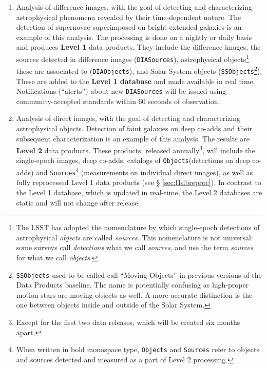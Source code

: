 \documentclass[12pt]{article}
\newcommand{\code}[1]{\texttt{#1}}
\newcommand{\DIASources}{\code{DIASources}\xspace}
\newcommand{\DIAObjects}{\code{DIAObjects}\xspace}
\newcommand{\DB}{{Level 1 database}\xspace}
\newcommand{\DR}{{Level 2 database}\xspace}
\newcommand{\Objects}{\code{Objects}\xspace}
\newcommand{\Sources}{\code{Sources}\xspace}
\newcommand{\SSObjects}{\code{SSObjects}\xspace}
\begin{document}
\begin{enumerate}
\item Analysis of difference images, with the goal of detecting and
      characterizing astrophysical phenomena revealed by their time-dependent
      nature. The detection of supernovae superimposed on bright extended
      galaxies is an example of this analysis. The processing is done on a
      nightly or daily basis and produces {\bf Level 1} data products. They
      include the difference images, the sources detected in difference images
      (\DIASources), astrophysical objects\footnote{The LSST has adopted the
      nomenclature by which single-epoch detections of astrophysical {\em
      objects} are called {\em sources}. This nomenclature is not universal:
      some surveys call {\em detections} what we call {\em sources}, and use
      the term {\em sources} for what we call {\em objects}.} these are
      associated to (\DIAObjects), and Solar System objects
      (\SSObjects\footnote{\SSObjects used to be called call ``Moving
      Objects'' in previous versions of the Data Products baseline. The name
      is potentially confusing as high-proper motion stars are moving objects
      as well. A more accurate distinction is the one between objects inside
      and outside of the Solar System.}). These are added to the {\bf \DB} and
      made available in real time. Notifications (``alerts'') about new
      \DIASources will be issued using community-accepted standards within 60
      seconds of observation.
\item Analysis of direct images, with the goal of detecting and characterizing
      astrophysical objects. Detection of faint galaxies on deep co-adds and
      their subsequent characterization is an example of this analysis. The
      results are {\bf Level 2} data products. These products, released
      annually\footnote{Except for the first two data releases, which will be
      created six months apart.}, will include the single-epoch images, deep
      co-adds, catalogs of \Objects (detections on deep co-adds) and
      \Sources\footnote{When written in bold monospace type, \Objects and
      \Sources refer to objects and sources detected and measured as a part of
      Level 2 processing.} (measurements on individual direct images), as well
      as fully reprocessed Level 1 data products (see \S
      \ref{sec:l1dbreproc}). In contrast to the \DB, which is updated in
      real-time, the \DR{}s are static and will not change after release.
\end{enumerate}
 
\end{document}
